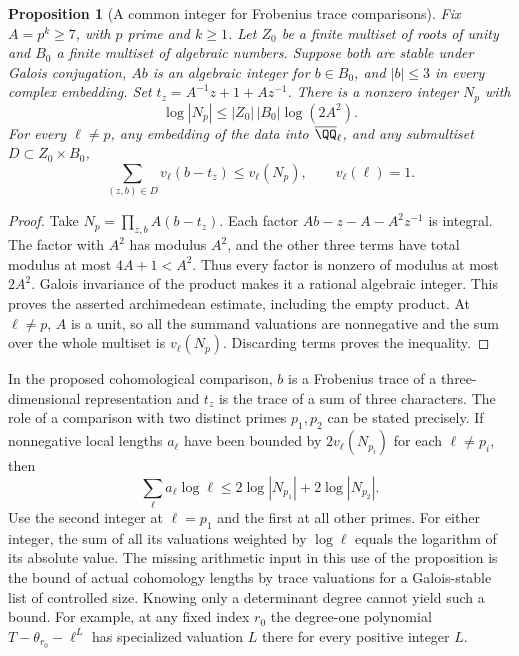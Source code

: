 \documentclass[a4paper,11pt]{article}
\newtheorem{proposition}{Proposition}[section]
\theoremstyle{definition}
\theoremstyle{remark}
\numberwithin{equation}{section}
\begin{document}
\begin{proposition}[A common integer for Frobenius trace comparisons]\label{prop:frob12}
Fix \(A=p^k\ge7\), with \(p\) prime and \(k\ge1\). Let \(Z_0\) be a finite multiset of roots of unity and \(B_0\) a finite multiset of algebraic numbers. Suppose both are stable under Galois conjugation, \(A b\) is an algebraic integer for \(b\in B_0\), and \(|b|\le3\) in every complex embedding. Set \(t_z=A^{-1}z+1+A z^{-1}\). There is a nonzero integer \(N_p\) with
\[
 \log|N_p|\le |Z_0|\,|B_0|\log(2A^2).
\]
For every \(\ell\ne p\), any embedding of the data into \(\overline{\QQ}_\ell\), and any submultiset \(D\subset Z_0\times B_0\),
\[
                \sum_{(z,b)\in D}v_\ell(b-t_z)\le v_\ell(N_p),
 \qquad v_\ell(\ell)=1 .
\]
\end{proposition}
\begin{proof}
Take \(N_p=\prod_{z,b}A(b-t_z)\). Each factor \(Ab-z-A-A^2z^{-1}\) is integral. The factor with \(A^2\) has modulus \(A^2\), and the other three terms have total modulus at most \(4A+1<A^2\). Thus every factor is nonzero of modulus at most \(2A^2\). Galois invariance of the product makes it a rational algebraic integer. This proves the asserted archimedean estimate, including the empty product. At \(\ell\ne p\), \(A\) is a unit, so all the summand valuations are nonnegative and the sum over the whole multiset is \(v_\ell(N_p)\). Discarding terms proves the inequality.
\end{proof}

In the proposed cohomological comparison, \(b\) is a Frobenius trace of a three-dimensional representation and \(t_z\) is the trace of a sum of three characters. The role of a comparison with two distinct primes \(p_1,p_2\) can be stated precisely. If nonnegative local lengths \(a_\ell\) have been bounded by \(2v_\ell(N_{p_i})\) for each \(\ell\ne p_i\), then
\[
             \sum_{\ell} a_\ell\log\ell
                    \le 2\log|N_{p_1}|+2\log|N_{p_2}|.
\]
Use the second integer at \(\ell=p_1\) and the first at all other primes. For either integer, the sum of all its valuations weighted by \(\log\ell\) equals the logarithm of its absolute value. The missing arithmetic input in this use of the proposition is the bound of actual cohomology lengths by trace valuations for a Galois-stable list of controlled size. Knowing only a determinant degree cannot yield such a bound. For example, at any fixed index \(r_0\) the degree-one polynomial \(T-\theta_{r_0}-\ell^L\) has specialized valuation \(L\) there for every positive integer \(L\).
\end{document}
